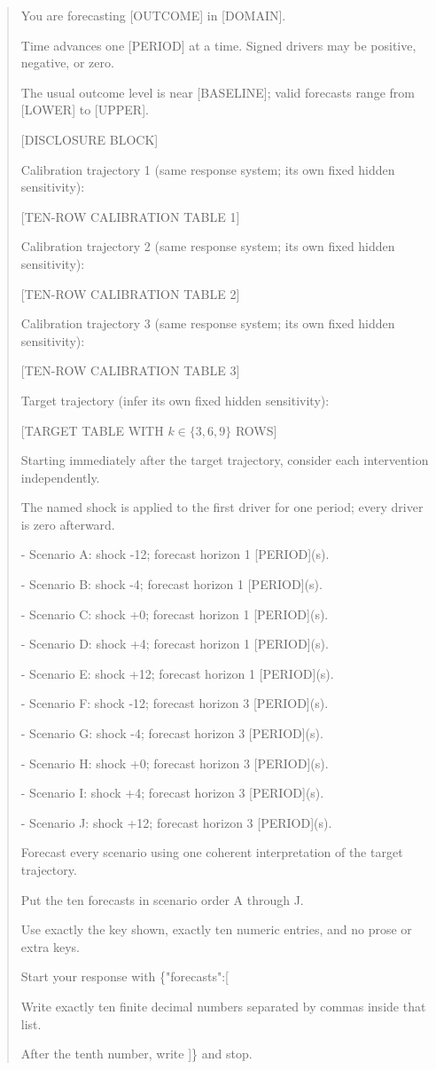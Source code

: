 \begin{quote}
\begingroup\ttfamily\scriptsize\raggedright
You are forecasting [OUTCOME] in [DOMAIN].

Time advances one [PERIOD] at a time. Signed drivers may be positive, negative,
or zero.

The usual outcome level is near [BASELINE]; valid forecasts range from [LOWER]
to [UPPER].

[DISCLOSURE BLOCK]

\smallskip
Calibration trajectory 1 (same response system; its own fixed hidden
sensitivity):

[TEN-ROW CALIBRATION TABLE 1]

\smallskip
Calibration trajectory 2 (same response system; its own fixed hidden
sensitivity):

[TEN-ROW CALIBRATION TABLE 2]

\smallskip
Calibration trajectory 3 (same response system; its own fixed hidden
sensitivity):

[TEN-ROW CALIBRATION TABLE 3]

\smallskip
Target trajectory (infer its own fixed hidden sensitivity):

[TARGET TABLE WITH $k\in\{3,6,9\}$ ROWS]

\smallskip
Starting immediately after the target trajectory, consider each intervention
independently.

The named shock is applied to the first driver for one period; every driver is
zero afterward.

- Scenario A: shock -12; forecast horizon 1 [PERIOD](s).

- Scenario B: shock -4; forecast horizon 1 [PERIOD](s).

- Scenario C: shock +0; forecast horizon 1 [PERIOD](s).

- Scenario D: shock +4; forecast horizon 1 [PERIOD](s).

- Scenario E: shock +12; forecast horizon 1 [PERIOD](s).

- Scenario F: shock -12; forecast horizon 3 [PERIOD](s).

- Scenario G: shock -4; forecast horizon 3 [PERIOD](s).

- Scenario H: shock +0; forecast horizon 3 [PERIOD](s).

- Scenario I: shock +4; forecast horizon 3 [PERIOD](s).

- Scenario J: shock +12; forecast horizon 3 [PERIOD](s).

\smallskip
Forecast every scenario using one coherent interpretation of the target
trajectory.

Put the ten forecasts in scenario order A through J.

Use exactly the key shown, exactly ten numeric entries, and no prose or extra
keys.

Start your response with \{"forecasts":[

Write exactly ten finite decimal numbers separated by commas inside that list.

After the tenth number, write ]\} and stop.
\endgroup
\end{quote}

